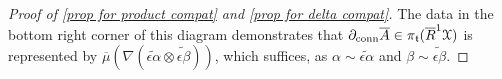 \documentclass[11pt]{amsart} \renewcommand{\baselinestretch}{1.2}
\theoremstyle{plain}
\theoremstyle{definition}
\renewcommand{\to}{\longrightarrow}
\newcommand{\frakt}{\mathfrak{t}}
\newcommand{\fraks}{\mathfrak{s}}
\newcommand{\calx}{\mathcal{X}}
\newcommand{\Dendo}{R}
\begin{document}
\begin{Operations on the Bousfield-Kan spectral sequence}
\begin{proof}[Proof of \ref{prop for product compat} and \ref{prop for delta compat}]
The data in the bottom right corner of this diagram demonstrates that $\partial_\textup{conn}\overline{A}\in\pi_\frakt(\overline{\Dendo}^1\calx )$ is represented by ${\overline{\mu}(\nabla(\widetilde{\epsilon\alpha} \otimes\widetilde{\epsilon\beta}))}$,
which suffices, as $\alpha\sim \widetilde{\epsilon\alpha}$ and $\beta\sim \widetilde{\epsilon\beta}$.
\end{proof}




\end{Operations on the Bousfield-Kan spectral sequence}
\end{document}
